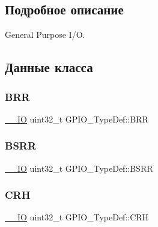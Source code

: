 \subsection{Подробное описание}
General Purpose I/O. 

\subsection{Данные класса}
\mbox{\label{struct_g_p_i_o___type_def_aab918bfbfae459789db1fd0b220c7f21}} 
\subsubsection{\texorpdfstring{BRR}{BRR}}
{\footnotesize\ttfamily \mbox{\hyperlink{group___c_m_s_i_s___c_m3__core__definitions_gaec43007d9998a0a0e01faede4133d6be}{\+\_\+\+\_\+\+IO}} uint32\+\_\+t G\+P\+I\+O\+\_\+\+Type\+Def\+::\+B\+RR}

\mbox{\label{struct_g_p_i_o___type_def_acd6f21e08912b484c030ca8b18e11cd6}} 
\subsubsection{\texorpdfstring{BSRR}{BSRR}}
{\footnotesize\ttfamily \mbox{\hyperlink{group___c_m_s_i_s___c_m3__core__definitions_gaec43007d9998a0a0e01faede4133d6be}{\+\_\+\+\_\+\+IO}} uint32\+\_\+t G\+P\+I\+O\+\_\+\+Type\+Def\+::\+B\+S\+RR}

\mbox{\label{struct_g_p_i_o___type_def_afe53502a3dbf9e7dcf9ac83f67ac481d}} 
\subsubsection{\texorpdfstring{CRH}{CRH}}
{\footnotesize\ttfamily \mbox{\hyperlink{group___c_m_s_i_s___c_m3__core__definitions_gaec43007d9998a0a0e01faede4133d6be}{\+\_\+\+\_\+\+IO}} uint32\+\_\+t G\+P\+I\+O\+\_\+\+Type\+Def\+::\+C\+RH}

\mbox{\label{struct_g_p_i_o___type_def_a218d21e9ca712cec4ca8f00406b2ec29}} 
